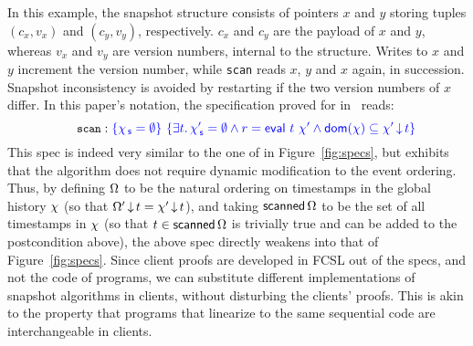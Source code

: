 In this example, the snapshot structure consists of pointers $x$ and
$y$ storing tuples $(c_x, v_x)$ and $(c_y, v_y)$, respectively. $c_x$
and $c_y$ are the payload of $x$ and $y$, whereas $v_x$ and $v_y$ are
version numbers, internal to the structure. Writes to $x$ and $y$
increment the version number, while {\tt scan} reads $x$, $y$ and $x$
again, in succession. Snapshot inconsistency is avoided by restarting
if the two version numbers of $x$ differ. In this paper's notation,
the specification proved for \jyscan in~\cite{SergeyNB+ESOP15} reads:
\[\hfill
\esc{scan} : \tsPos{\{\histS = \hempty\}}\
\tsPos{\{\exists t\ldot \histS' = \hempty \wedge
  r = \eval\ t\ \histP \wedge \dom{\hist}
  \subseteq \ideal{\histP}{t}\}}\hfill
\]
This spec is indeed very similar to the one of \jyscan in
Figure~\ref{fig:specs}, but exhibits that the algorithm does not
require dynamic modification to the event ordering. Thus, by defining
$\Omega$ to be the natural ordering on timestamps in the global
history $\chi$ (so that $\Omega'\,{\downarrow}\,t =
\chi'\,{\downarrow}\,t$), and taking $\mathsf{scanned}\,\Omega$ to be the set
of all timestamps in $\chi$ (so that $t \in \mathsf{scanned}\,\Omega$
is trivially true and can be added to the postcondition above), the
above spec directly weakens into that of Figure~\ref{fig:specs}.
%
Since client proofs are developed in FCSL out of the specs, and not
the code of programs, we can substitute different implementations of
snapshot algorithms in clients, without disturbing the clients'
proofs.
%
This is akin to the property that programs that linearize to the same
sequential code are interchangeable in clients.

